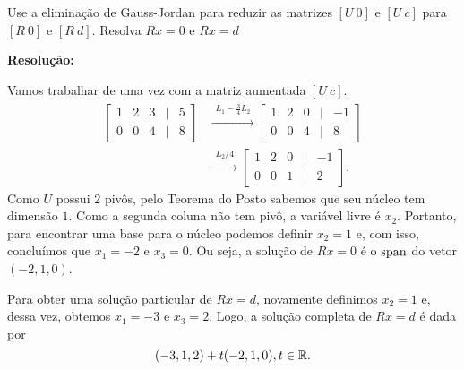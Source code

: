 \documentclass[leqno]{article}
\numberwithin{equation}{section}
\newenvironment{sol}
{
    \vspace{4mm}
    \noindent\textbf{Resolução:}
    \strut\newline
    \smallskip
    \hspace{-3.5mm}
}
{}
\begin{document}
\begin{enumerate}
        Use a eliminação de Gauss-Jordan para reduzir as matrizes $[U \ 0]$ e $[U \ c]$ para $[R \ 0]$ e $[R \ d]$. Resolva $Rx = 0$ e $Rx = d$

        \begin{sol} 
            Vamos trabalhar de uma vez com a matriz aumentada \( [ U \ c] \).
            \begin{align*}
                \begin{bmatrix}
                    1 & 2 & 3 & \mid & 5 \\
                    0 & 0 & 4 & \mid & 8
                \end{bmatrix}
                &\xrightarrow{
                    \begin{array}{l}
                        L_{ 1 } - \frac{ 3 }{ 4 } L_{ 2 }
                    \end{array}
                }
                \begin{bmatrix}
                    1 & 2 & 0 & \mid & -1 \\
                    0 & 0 & 4 & \mid & 8
                \end{bmatrix} \\
                &\xrightarrow{
                    \begin{array}{l}
                        L_{ 2 }/4
                    \end{array}
                }
                \begin{bmatrix}
                    1 & 2 & 0 & \mid & -1 \\
                    0 & 0 & 1 & \mid & 2
                \end{bmatrix}
            .\end{align*}
            Como \( U \) possui \( 2 \) pivôs, pelo Teorema do Posto sabemos que seu núcleo tem dimensão \( 1 \).
            Como a segunda coluna não tem pivô, a variável livre é \( x_{ 2 } \).
            Portanto, para encontrar uma base para o núcleo podemos definir \( x_{ 2 } = 1 \) e, com isso, concluímos que \( x_{ 1 } = -2 \) e \( x_{ 3 } = 0 \).
            Ou seja, a solução de \( Rx = 0 \) é o \( \operatorname{span} \) do vetor \( ( -2, 1, 0 ) \).

            Para obter uma solução particular de \( Rx = d \), novamente definimos \( x_{ 2 } = 1 \) e, dessa vez, obtemos \( x_{ 1 } = -3 \) e \( x_{ 3 } = 2 \).
            Logo, a solução completa de \( Rx = d \) é dada por
            \begin{equation*}
                ( -3, 1, 2 ) + t ( -2, 1, 0 ), t \in \mathbb{R}
            .\end{equation*}
        \end{sol} 


\end{enumerate}
\end{document}
